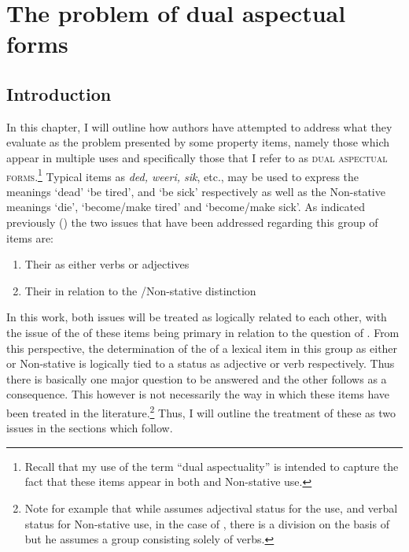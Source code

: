 \chapter{The problem of dual aspectual forms}\label{ch:3}\label{sec:3}
\section{Introduction}\label{sec:3.0}

In this chapter, I will outline how authors have attempted to address
what they evaluate as the problem presented by some property items,
namely those which appear in multiple uses and specifically those that
I refer to as \textsc{dual aspectual forms}.\footnote{Recall that my use of the
  term ``dual aspectuality'' is intended to capture the fact that these
  items appear in both  and Non-stative use.}  Typical items
as \textit{ded, weeri, sik}, etc., may be used to express the 
meanings `dead’ `be tired', and `be sick' respectively as well as the
Non-stative meanings `die',  `become\slash make tired' and `become\slash make
sick'. As indicated previously () the two issues
that have been addressed regarding this group of items are:

\begin{enumerate}
\item Their  as either verbs or adjectives
\item Their  in relation to the \slash Non-stative
  distinction
\end{enumerate}

In this work, both issues will be treated as logically related to each
other, with the issue of the  of these items being
primary in relation to the question of .  From this
perspective, the determination of the  of a lexical
item in this group as either  or Non-stative is logically tied
to a status as adjective or verb respectively.  Thus there is
basically one major question to be answered and the other follows as
a consequence.  This however is not necessarily the way in which these
items have been treated in the literature.\footnote{Note for example
  that while \citet{Kouwenberg1996} assumes adjectival status for the
   use, and verbal status for Non-stative use, in the case of
  \citet{Winford1993}, there is a division on the basis of 
  but he assumes a group consisting solely of verbs.} Thus, I will
outline the treatment of these as two issues in the sections which
follow.

